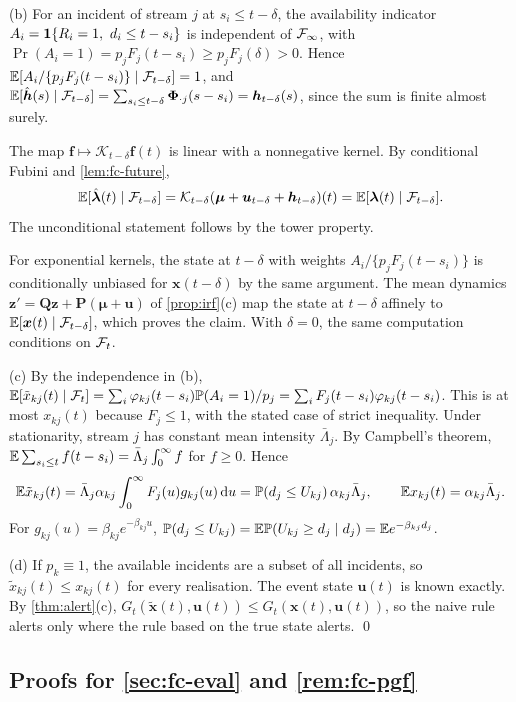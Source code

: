 (b) For an incident of stream $j$ at $s_i\le t-\delta$, the availability indicator
$A_i=\ind{R_i=1,\ d_i\le t-s_i}$ is independent of $\mathcal{F}_\infty$, with
$\Pr(A_i=1)=p_jF_j(t-s_i)\ge p_jF_j(\delta)>0$. Hence
$\mathbb{E}[A_i/\{p_jF_j(t-s_i)\}\mid\mathcal{F}_{t-\delta}]=1$, and
$\mathbb{E}[\hat{\bm h}(s)\mid\mathcal{F}_{t-\delta}]=\sum_{s_i\le t-\delta}\bm{\Phi}_{\cdot j}(s-s_i)=\bm h_{t-\delta}(s)$,
since the sum is finite almost surely.

The map $\bm f\mapsto\mathcal K_{t-\delta}\bm f(t)$ is linear with a nonnegative kernel.
By conditional Fubini and \cref{lem:fc-future},
\[
\mathbb{E}[\hat{\bm\lambda}(t)\mid\mathcal{F}_{t-\delta}]
=\mathcal K_{t-\delta}(\bm\mu+\bm u_{t-\delta}+\bm h_{t-\delta})(t)
=\mathbb{E}[\bm\lambda(t)\mid\mathcal{F}_{t-\delta}] .
\]
The unconditional statement follows by the tower property.

For exponential kernels, the state at $t-\delta$ with weights $A_i/\{p_jF_j(t-s_i)\}$
is conditionally unbiased for $\bm x(t-\delta)$ by the same argument. The mean
dynamics $\bm z'=\bm Q\bm z+\bm P(\bm\mu+\bm u)$ of \cref{prop:irf}(c) map the state at
$t-\delta$ affinely to $\mathbb{E}[\bm x(t)\mid\mathcal{F}_{t-\delta}]$, which proves the claim. With
$\delta=0$, the same computation conditions on $\mathcal{F}_t$.

(c) By the independence in (b),
$\mathbb{E}[\tilde x_{kj}(t)\mid\mathcal{F}_t]=\sum_i\varphi_{kj}(t-s_i)\mathbb{P}(A_i=1)/p_j=\sum_iF_j(t-s_i)\varphi_{kj}(t-s_i)$.
This is at most $x_{kj}(t)$ because $F_j\le1$, with the stated case of strict
inequality. Under stationarity, stream $j$ has constant mean intensity
$\bar\Lambda_j$. By Campbell's theorem,
$\mathbb{E}\sum_{s_i\le t}f(t-s_i)=\bar\Lambda_j\int_0^\infty f$ for $f\ge0$. Hence
\[
\mathbb{E}\tilde x_{kj}(t)=\bar\Lambda_j\alpha_{kj}\int_0^\infty F_j(u)g_{kj}(u)\,\mathrm{d} u
=\mathbb{P}(d_j\le U_{kj})\,\alpha_{kj}\bar\Lambda_j,
\qquad \mathbb{E} x_{kj}(t)=\alpha_{kj}\bar\Lambda_j .
\]
For $g_{kj}(u)=\beta_{kj}e^{-\beta_{kj}u}$,
$\mathbb{P}(d_j\le U_{kj})=\mathbb{E}\mathbb{P}(U_{kj}\ge d_j\mid d_j)=\mathbb{E} e^{-\beta_{kj}d_j}$.

(d) If $p_k\equiv1$, the available incidents are a subset of all incidents, so
$\tilde x_{kj}(t)\le x_{kj}(t)$ for every realisation. The event state $\bm u(t)$ is
known exactly. By \cref{thm:alert}(c),
$G_t(\tilde{\bm x}(t),\bm u(t))\le G_t(\bm x(t),\bm u(t))$, so the naive rule alerts
only where the rule based on the true state alerts. \qed

\subsection{Proofs for \texorpdfstring{\cref{sec:fc-eval}}{the evaluation subsection} and \texorpdfstring{\cref{rem:fc-pgf}}{the PGF remark}}\label{app:fc-eval}


